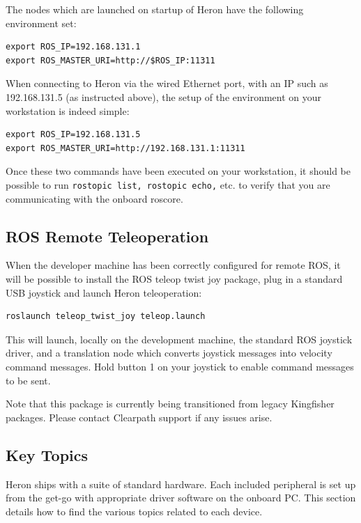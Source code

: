 \documentclass[]{clearpath-latex/clearpath-manual}
\begin{document}
The nodes which are launched on startup of Heron have the following environment set:

\begin{lstlisting}
export ROS_IP=192.168.131.1 
export ROS_MASTER_URI=http://$ROS_IP:11311
\end{lstlisting}

When connecting to Heron via the wired Ethernet port, with an IP such as 192.168.131.5 (as instructed above), the setup of the environment on your workstation is indeed simple:

\begin{lstlisting}
export ROS_IP=192.168.131.5
export ROS_MASTER_URI=http://192.168.131.1:11311
\end{lstlisting}

Once these two commands have been executed on your workstation, it should be possible to run \lstinline{rostopic list, rostopic echo,} etc. to verify that you are communicating with the onboard roscore.



\subsection{ROS Remote Teleoperation}

When the developer machine has been correctly configured for remote ROS, it will be possible to install the ROS teleop twist joy package, plug in a standard USB joystick and launch Heron teleoperation:

\begin{lstlisting}
roslaunch teleop_twist_joy teleop.launch
\end{lstlisting}

This will launch, locally on the development machine, the standard ROS joystick driver, and a translation node which converts joystick messages into velocity command messages. Hold button 1 on your joystick to enable command messages to be sent.

Note that this package is currently being transitioned from legacy Kingfisher packages. Please contact Clearpath support if any issues arise. 

\pagebreak

\subsection{Key Topics}
Heron ships with a suite of standard hardware. Each included peripheral is set up from the get-go with appropriate driver software on the onboard PC. This section details how to find the various topics related to each device.
\end{document}
